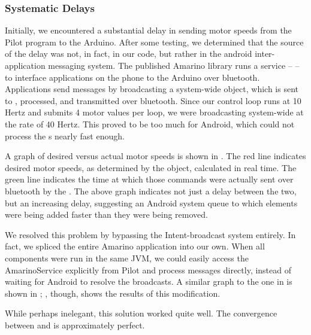 \subsubsection{Systematic Delays}
Initially, we encountered a substantial delay in sending motor speeds
from the Pilot program to the Arduino.  After some testing, we
determined that the source of the delay was not, in fact, in our code,
but rather in the android inter-application messaging system.  The
published Amarino library runs a service --  --
to interface applications on the phone to the Arduino over bluetooth.
Applications send messages by broadcasting a system-wide 
object, which is sent to , processed, and
transmitted over bluetooth.  Since our control loop runs at 10 Hertz
and submits 4 motor values per loop, we were broadcasting system-wide
 at the rate of 40 Hertz.  This proved to be too much
for Android, which could not process the s nearly fast
enough.


A graph of desired versus actual motor speeds is shown in
. The red line indicates desired motor speeds, as
determined by the  object, calculated in real time.
The green line indicates the time at which those commands were
actually sent over bluetooth by the .  The above
graph indicates not just a delay between the two, but an increasing
delay, suggesting an Android system queue to which elements were being
added faster than they were being removed.

We resolved this problem by bypassing the Intent-broadcast system
entirely.  In fact, we spliced the entire Amarino application into our
own.  When all components were run in the same JVM, we could easily
access the AmarinoService explicitly from Pilot and process messages
directly, instead of waiting for Android to resolve the broadcasts. A
similar graph to the one in  is shown in
; , though, shows the results of this
modification.


While perhaps inelegant, this solution worked quite well.  The
convergence between  and  is
approximately perfect.

